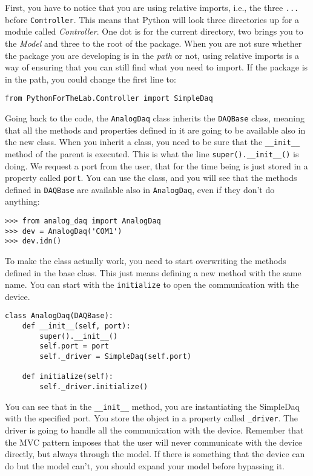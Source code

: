 First, you have to notice that you are using relative imports, i.e., the
three \texttt{...} before \texttt{Controller}. This means that Python
will look three directories up for a module called \emph{Controller}.
One dot is for the current directory, two brings you to the \emph{Model}
and three to the root of the package. When you are not sure whether the
package you are developing is in the \emph{path} or not, using relative
imports is a way of ensuring that you can still find what you need to
import. If the package is in the path, you could change the first
line to:

\begin{verbatim}
from PythonForTheLab.Controller import SimpleDaq
\end{verbatim}

Going back to the code, the \texttt{AnalogDaq} class inherits the
\texttt{DAQBase} class, meaning that all the methods and properties
defined in it are going to be available also in the new class. When you
inherit a class, you need to be sure that the \texttt{__init__}
method of the parent is executed. This is what the line
\texttt{super().__init__()} is doing. We request a port from the user, that for the time being is just stored in a property called
\texttt{port}. You can use the class, and you will see that the methods
defined in \texttt{DAQBase} are available also in \texttt{AnalogDaq},
even if they don't do anything:

\begin{verbatim}
>>> from analog_daq import AnalogDaq
>>> dev = AnalogDaq('COM1')
>>> dev.idn()
\end{verbatim}

To make the class actually work, you need to start overwriting the
methods defined in the base class. This just means defining a new method
with the same name. You can start with the \texttt{initialize} to open
the communication with the device.

\begin{verbatim}
class AnalogDaq(DAQBase):
    def __init__(self, port):
        super().__init__()
        self.port = port
        self._driver = SimpleDaq(self.port)
    
    def initialize(self):
        self._driver.initialize()
\end{verbatim}

You can see that in the \texttt{__init__} method, you are
instantiating the SimpleDaq with the specified port. You store the
object in a property called \texttt{_driver}. The driver is going to
handle all the communication with the device. Remember that the {MVC}
pattern imposes that the user will never communicate with the device
directly, but always through the model. If there is something that the
device can do but the model can't, you should expand your model before
bypassing it.

